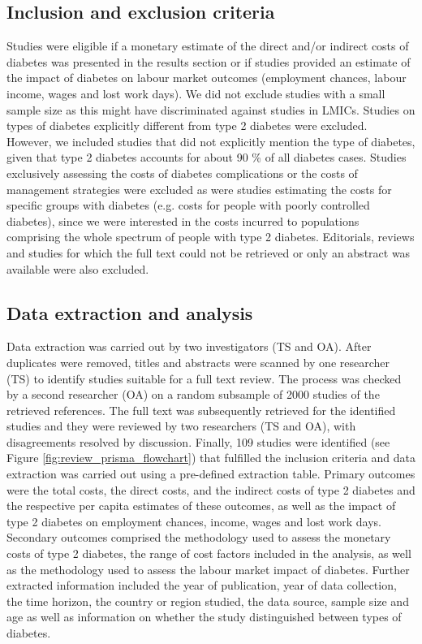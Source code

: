 \subsection{Inclusion and exclusion criteria}
Studies were eligible if a monetary estimate of the direct and/or indirect costs of diabetes was presented in the results section or if studies provided an estimate of the impact of diabetes on labour market outcomes (employment chances, labour income, wages and lost work days). We did not exclude studies with a small sample size as this might have discriminated against studies in \acp{LMIC}. Studies on types of diabetes explicitly different from type 2 diabetes were excluded. However, we included studies that did not explicitly mention the type of diabetes, given that type 2 diabetes accounts for about 90 \% of all diabetes cases. Studies exclusively assessing the costs of diabetes complications or the costs of management strategies were excluded as were studies estimating the costs for specific groups with diabetes (e.g. costs for people with poorly controlled diabetes), since we were interested in the costs incurred to populations comprising the whole spectrum of people with type 2 diabetes. Editorials, reviews and studies for which the full text could not be retrieved or only an abstract was available were also excluded.

\subsection{Data extraction and analysis}
Data extraction was carried out by two investigators (TS and OA). After duplicates were removed, titles and abstracts were scanned by one researcher (TS) to identify studies suitable for a full text review. The process was checked by a second researcher (OA) on a random subsample of 2000 studies of the retrieved references. The full text was subsequently retrieved for the identified studies and they were reviewed by two researchers (TS and OA), with disagreements resolved by discussion. Finally, 109 studies were identified (see Figure \ref{fig:review_prisma_flowchart}) that fulfilled the inclusion criteria and data extraction was carried out using a pre-defined extraction table. Primary outcomes were the total costs, the direct costs, and the indirect costs of type 2 diabetes and the respective per capita estimates of these outcomes, as well as the impact of type 2 diabetes on employment chances, income, wages and lost work days. Secondary outcomes comprised the methodology used to assess the monetary costs of type 2 diabetes, the range of cost factors included in the analysis, as well as the methodology used to assess the labour market impact of diabetes. Further extracted information included the year of publication, year of data collection, the time horizon, the country or region studied, the data source, sample size and age as well as information on whether the study distinguished between types of diabetes.


